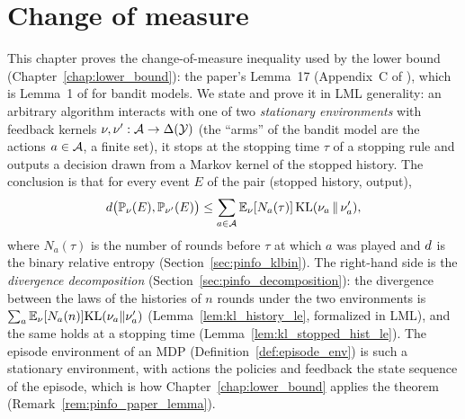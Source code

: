 \chapter{Change of measure}
\label{chap:pre_info}

This chapter proves the change-of-measure inequality used by the lower bound
(Chapter~\ref{chap:lower_bound}): the paper's Lemma~17 (Appendix~C of
\cite{essakine2026tight}), which is Lemma~1 of \cite{kaufmann2016complexity} for bandit models.
We state and prove it in LML generality: an arbitrary algorithm interacts with one of two
\emph{stationary environments} with feedback kernels $\nu, \nu' : \mathcal{A} \to \Delta(\mathcal Y)$
(the ``arms'' of the bandit model are the actions $a \in \mathcal{A}$, a finite set), it stops at the
stopping time $\tau$ of a stopping rule and outputs a decision drawn from a Markov kernel of
the stopped history. The conclusion is that for every event $E$ of the pair (stopped history,
output),
\[
  d\big(\mathbb{P}_\nu(E), \mathbb{P}_{\nu'}(E)\big)
  \le \sum_{a \in \mathcal{A}} \mathbb{E}_\nu[N_a(\tau)]\,\mathrm{KL}(\nu_a \,\|\, \nu'_a),
\]
where $N_a(\tau)$ is the number of rounds before $\tau$ at which $a$ was played and $d$
is the binary relative entropy (Section~\ref{sec:pinfo_klbin}). The right-hand side is the
\emph{divergence decomposition} (Section~\ref{sec:pinfo_decomposition}): the divergence between
the laws of the histories of $n$ rounds under the two environments is
$\sum_a \mathbb{E}_\nu[N_a(n)] \mathrm{KL}(\nu_a\|\nu'_a)$ (Lemma~\ref{lem:kl_history_le}, formalized in LML),
and the same holds at a stopping time (Lemma~\ref{lem:kl_stopped_hist_le}). The episode
environment of an MDP (Definition~\ref{def:episode_env}) is such a stationary environment, with
actions the policies and feedback the state sequence of the episode, which is how
Chapter~\ref{chap:lower_bound} applies the theorem (Remark~\ref{rem:pinfo_paper_lemma}).

